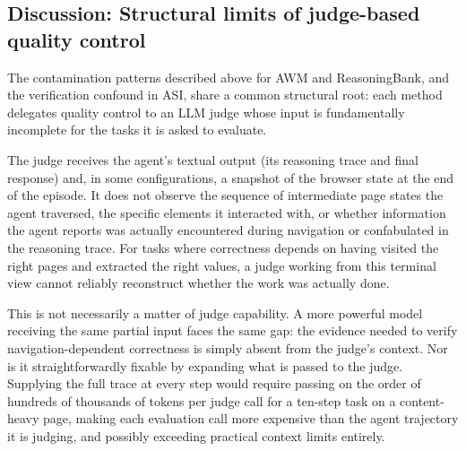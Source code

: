 \subsection{Discussion: Structural limits of judge-based quality control}
\label{app:judge-limits}

The contamination patterns described above for AWM and ReasoningBank, and the verification confound in ASI, share a common structural root: each method delegates quality control to an LLM judge whose input is fundamentally incomplete for the tasks it is asked to evaluate.

The judge receives the agent's textual output (its reasoning trace and final response) and, in some configurations, a snapshot of the browser state at the end of the episode.
It does not observe the sequence of intermediate page states the agent traversed, the specific elements it interacted with, or whether information the agent reports was actually encountered during navigation or confabulated in the reasoning trace.
For tasks where correctness depends on having visited the right pages and extracted the right values, a judge working from this terminal view cannot reliably reconstruct whether the work was actually done.

This is not necessarily a matter of judge capability.
A more powerful model receiving the same partial input faces the same gap: the evidence needed to verify navigation-dependent correctness is simply absent from the judge's context.
Nor is it straightforwardly fixable by expanding what is passed to the judge.
Supplying the full trace at every step
would require passing on the order of hundreds of thousands of tokens per judge call for a ten-step task on a content-heavy page, making each evaluation call more expensive than the agent trajectory it is judging, and possibly exceeding practical context limits entirely.

